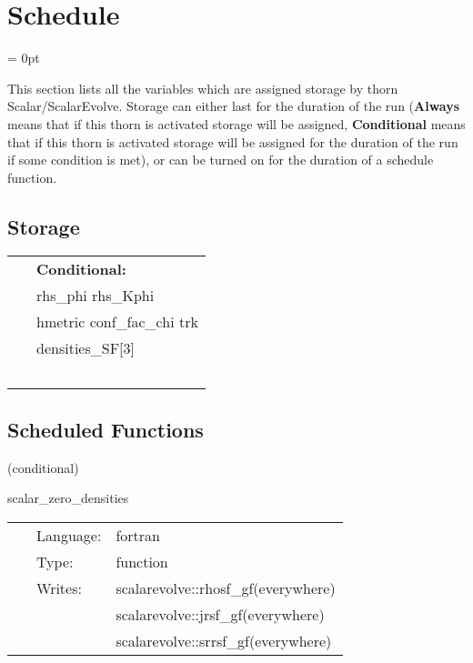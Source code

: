 
\section{Schedule} 


\parskip = 0pt


\noindent This section lists all the variables which are assigned storage by thorn Scalar/ScalarEvolve.  Storage can either last for the duration of the run ({\bf Always} means that if this thorn is activated storage will be assigned, {\bf Conditional} means that if this thorn is activated storage will be assigned for the duration of the run if some condition is met), or can be turned on for the duration of a schedule function.


\subsection*{Storage}

\hspace{5mm}

 \begin{tabular*}{160mm}{ll} 
~& {\bf Conditional:} \\ 
~ &  rhs\_phi rhs\_Kphi\\ 
~ &  hmetric conf\_fac\_chi trk\\ 
~ &  densities\_SF[3]\\ 
~ & ~\\ 
\end{tabular*} 


\subsection*{Scheduled Functions}
\vspace{5mm}

   (conditional) 

\hspace{5mm} scalar\_zero\_densities 

\hspace{5mm}{\it initialise the sf densities to zero } 


\hspace{5mm}

 \begin{tabular*}{160mm}{cll} 
~ & Language:  & fortran \\ 
~ & Type:  & function \\ 
~ & Writes:  & scalarevolve::rhosf\_gf(everywhere) \\ 
~& ~ &scalarevolve::jrsf\_gf(everywhere)\\ 
~& ~ &scalarevolve::srrsf\_gf(everywhere)\\ 
\end{tabular*} 


